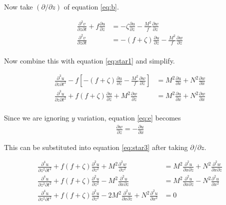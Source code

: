 \documentclass[12 pt]{article}
\numberwithin{equation}{section} %
\begin{document}
Now take $(\partial/\partial z)$ of equation \ref{eq:b}.

\begin{align*}
  \frac{\partial^2 v}{\partial z \partial t} + f\frac{\partial u}{\partial z} &= -\zeta \frac{\partial u}{\partial z} - \frac{M^2}{f}\frac{\partial w}{\partial z} \\
  \frac{\partial^2 v}{\partial z \partial t} &= -(f + \zeta) \frac{\partial u}{\partial z} - \frac{M^2}{f}\frac{\partial w}{\partial z} \\
\end{align*}

Now combine this with equation \ref{eq:star1} and simplify.

\begin{align}
  \frac{\partial^3 u}{\partial z \partial t^2} - f\left[ -(f + \zeta) \frac{\partial u}{\partial z} - \frac{M^2}{f}\frac{\partial w}{\partial z} \right] &= M^2 \frac{\partial u}{\partial x} + N^2 \frac{\partial w}{\partial x} \nonumber \\
  \frac{\partial^3 u}{\partial z \partial t^2} + f(f + \zeta) \frac{\partial u}{\partial z} + M^2\frac{\partial w}{\partial z} &= M^2 \frac{\partial u}{\partial x} + N^2 \frac{\partial w}{\partial x} \label{eq:star3} \\
\end{align}

Since we are ignoring $y$ variation, equation \ref{eq:e} becomes
\begin{align*}
\frac{\partial w}{\partial z} = -\frac{\partial u}{\partial x}
\end{align*}

This can be substituted into equation \ref{eq:star3} after taking $\partial/\partial z$.

\begin{align}
  \frac{\partial^4 u}{\partial z^2 \partial t^2} + f(f + \zeta) \frac{\partial^2 u}{\partial z^2} + M^2\frac{\partial^2 w}{\partial z^2} &= M^2 \frac{\partial^2 u}{\partial x \partial z} + N^2 \frac{\partial^2 w}{\partial x \partial z} \nonumber \\
  \frac{\partial^4 u}{\partial z^2 \partial t^2} + f(f + \zeta) \frac{\partial^2 u}{\partial z^2} - M^2\frac{\partial^2 u}{\partial x \partial z} &= M^2 \frac{\partial^2 u}{\partial x \partial z} - N^2 \frac{\partial^2 u}{\partial x^2} \nonumber \\
  \frac{\partial^4 u}{\partial z^2 \partial t^2} + f(f + \zeta) \frac{\partial^2 u}{\partial z^2} - 2M^2\frac{\partial^2 u}{\partial x \partial z} + N^2 \frac{\partial^2 u}{\partial x^2} &= 0  \label{eq:last}
\end{align}
\end{document}
